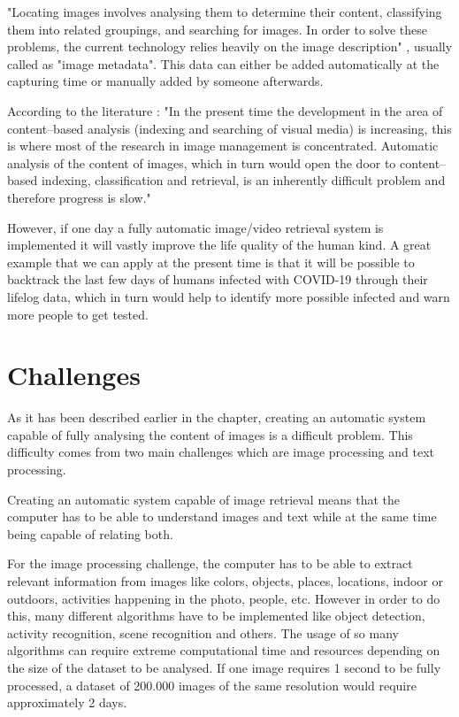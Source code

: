 "Locating images involves analysing them to determine their content, classifying them into related groupings, and searching for  images. In order to solve these problems, the current technology relies heavily on the image description" \cite{Zhang2008}, usually called as "image metadata". This data can either be added automatically at the capturing time or manually added by someone afterwards.

According to the literature \cite{Zhang2008} : "In the present time the development in the area of content–based analysis (indexing and searching of visual media) is increasing, this is where most of the research in image management is concentrated. Automatic analysis of the content of images, which in turn would open the door to content–based indexing, classification and retrieval, is an inherently difficult problem and therefore progress is slow." 

However, if one day a fully automatic image/video retrieval system is implemented it will vastly improve the life quality of the human kind. A great example that we can apply at the present time is that it will be possible to backtrack the last few days of humans infected with COVID-19 through their lifelog data, which in turn would help to identify more possible infected and warn more people to get tested.

\section{Challenges}

As it has been described earlier in the chapter, creating an automatic system capable of fully analysing the content of images is a difficult problem. This difficulty comes from two main challenges which are image processing and text processing. 

Creating an automatic system capable of image retrieval means that the computer has to be able to understand images and text while at the same time being capable of relating both.

For the image processing challenge, the computer has to be able to extract relevant information from images like colors, objects, places, locations, indoor or outdoors, activities happening in the photo, people, etc. However in order to do this,  many different algorithms have to be implemented like object detection, activity recognition, scene recognition and others. The usage of so many algorithms can require extreme computational time and resources depending on the size of the dataset to be analysed. If one image requires 1 second to be fully processed, a dataset of 200.000 images of the same resolution would require approximately 2 days.

